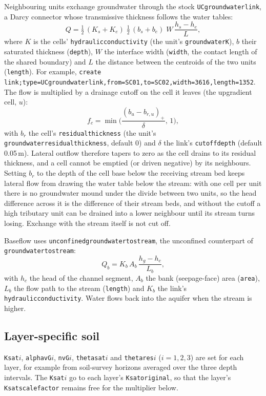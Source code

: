 \documentclass[11pt,a4paper]{article}
\newcommand{\code}[1]{\texttt{\small #1}}
\renewcommand{\_}{\oldus\allowbreak}   %
\begin{document}
Neighbouring units exchange groundwater through the stock \code{UC\_groundwater\_link}, a Darcy
connector whose transmissive thickness follows the water tables:
\begin{equation}
Q = \tfrac12\,(K_s+K_e)\;\tfrac12\,(b_s+b_e)\; W\,\frac{h_s-h_e}{L},
\end{equation}
where $K$ is the cells' \code{hydraulic\_conductivity} (the unit's \code{groundwater\_K}), $b$ their
saturated thickness (\code{depth}), $W$ the interface width (\code{width}, the contact length of the
shared boundary) and $L$ the distance between the centroids of the two units (\code{length}). For
example, \code{create link;type=UC\_groundwater\_link,from=SC01,to=SC02,width=3616,length=1352}.
The flow is multiplied by a drainage cutoff on the cell it leaves (the upgradient cell, $u$):
\begin{equation}
f_c=\min\!\Big(\frac{(b_u-b_{r,u})_+}{\delta},\,1\Big),
\end{equation}
with $b_r$ the cell's \code{residual\_thickness} (the unit's \code{groundwater\_residual\_thickness},
default 0) and $\delta$ the link's \code{cutoff\_depth} (default 0.05\,m). Lateral outflow therefore
tapers to zero as the cell drains to its residual thickness, and a cell cannot be emptied (or driven
negative) by its neighbours. Setting $b_r$ to the depth of the cell base below the receiving stream
bed keeps lateral flow from drawing the water table below the stream: with one cell per unit there
is no groundwater mound under the divide between two units, so the head difference across it is the
difference of their stream beds, and without the cutoff a high tributary unit can be drained into a
lower neighbour until its stream turns losing. Exchange with the stream itself is not cut off.

Baseflow uses \code{unconfined\_groundwater\_to\_stream}, the unconfined counterpart of
\code{groundwater\_to\_stream}:
\begin{equation}
Q_b = K_b\,A_b\,\frac{h_g-h_c}{L_b},
\end{equation}
with $h_c$ the head of the channel segment, $A_b$ the bank (seepage-face) area (\code{area}), $L_b$ the
flow path to the stream (\code{length}) and $K_b$ the link's \code{hydraulic\_conductivity}. Water
flows back into the aquifer when the stream is higher.

\subsection{Layer-specific soil}
\code{K\_sat\_}$i$, \code{alpha\_vG\_}$i$, \code{n\_vG\_}$i$, \code{theta\_sat\_}$i$ and
\code{theta\_res\_}$i$ ($i=1,2,3$) are set for each layer, for example from soil-survey horizons
averaged over the three depth intervals. The \code{K\_sat\_}$i$ go to each layer's
\code{K\_sat\_original}, so that the layer's \code{K\_sat\_scale\_factor} remains free for the
multiplier below.
\end{document}
